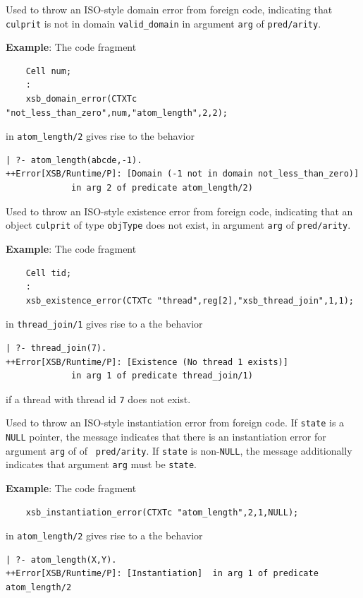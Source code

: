 \begin{description}
%
Used to throw an ISO-style domain error from foreign code, indicating
that {\tt culprit} is not in domain {\tt valid\_domain} in argument
{\tt arg} of {\tt pred/arity}.

{\bf Example}: The code fragment
%
\begin{verbatim}
    Cell num;
    : 
    xsb_domain_error(CTXTc "not_less_than_zero",num,"atom_length",2,2);
\end{verbatim}
in {\tt atom\_length/2} gives rise to the behavior
%
\begin{verbatim}
| ?- atom_length(abcde,-1).
++Error[XSB/Runtime/P]: [Domain (-1 not in domain not_less_than_zero)] 
             in arg 2 of predicate atom_length/2)
\end{verbatim}


%
Used to throw an ISO-style existence error from foreign code,
indicating that an object {\tt culprit} of type {\tt objType} does not
exist, in argument {\tt arg} of {\tt pred/arity}.

{\bf Example}: The code fragment
%
\begin{verbatim}
    Cell tid;
    :
    xsb_existence_error(CTXTc "thread",reg[2],"xsb_thread_join",1,1); 
\end{verbatim}
in {\tt thread\_join/1} gives rise to a the behavior
\begin{verbatim}
| ?- thread_join(7).
++Error[XSB/Runtime/P]: [Existence (No thread 1 exists)] 
             in arg 1 of predicate thread_join/1)
\end{verbatim}
if a thread with thread id {\tt 7} does not exist.


%
Used to throw an ISO-style instantiation error from foreign code.  If
{\tt state} is a {\tt NULL} pointer, the message indicates that there
is an instantiation error for argument {\tt arg} of of {\tt
  pred/arity}.  If {\tt state} is non-{\tt NULL}, the message
additionally indicates that argument {\tt arg} must be {\tt state}.

{\bf Example}: The code fragment
%
\begin{verbatim}
    xsb_instantiation_error(CTXTc "atom_length",2,1,NULL);
\end{verbatim}
in {\tt atom\_length/2} gives rise to a the behavior
\begin{verbatim}
| ?- atom_length(X,Y).
++Error[XSB/Runtime/P]: [Instantiation]  in arg 1 of predicate atom_length/2
\end{verbatim}


\end{description}

